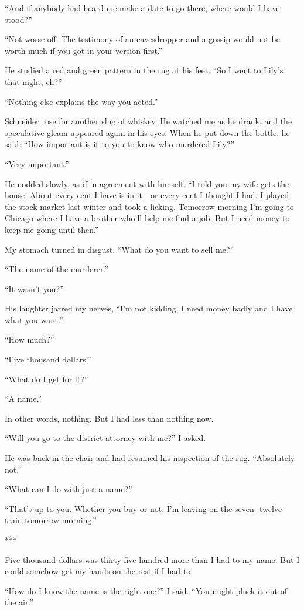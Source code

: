 \documentclass{novel}
\begin{document}
{“And if anybody had heard me make a date to go there, where would I have stood?”

“Not worse off. The testimony of an eavesdropper and a gossip would not be worth much if you got in your version first.”

He studied a red and green pattern in the rug at his feet. “So I went to Lily’s that night, eh?”

“Nothing else explains the way you acted.”

Schneider rose for another slug of whiskey. He watched me as he drank, and the speculative gleam appeared again in his eyes. When he put down the bottle, he said: “How important is it to you to know who murdered Lily?”

“Very important.”

He nodded slowly, as if in agreement with himself. “I told you my wife gets the house. About every cent I have is in it—or every cent I thought I had. I played the stock market last winter and took a licking. Tomorrow morning I’m going to Chicago where I have a brother who’ll help me find a job. But I need money to keep me going until then.”

My stomach turned in disgust. “What do you want to sell me?”

“The name of the murderer.”

“It wasn’t you?”

His laughter jarred my nerves, “I’m not kidding. I need money badly and I have what you want.”

“How much?”

“Five thousand dollars.”

“What do I get for it?”

“A name.”

In other words, nothing. But I had less than nothing now.

“Will you go to the district attorney with me?” I asked.

He was back in the chair and had resumed his inspection of the rug. “Absolutely not.”

“What can I do with just a name?”

“That’s up to you. Whether you buy or not, I’m leaving on the seven- twelve train tomorrow morning.”

***

Five thousand dollars was thirty-five hundred more than I had to my name. But I could somehow get my hands on the rest if I had to.

“How do I know the name is the right one?” I said. “You might pluck it out of the air.”

}
\end{document}
